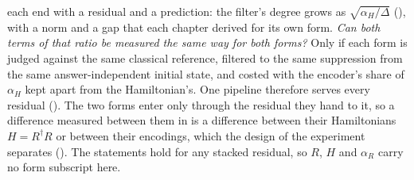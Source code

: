 
 each end with a residual and a prediction: the filter's degree grows as $\sqrt{\alpha_H/\Delta}$ (), with a norm and a gap that each chapter derived for its own form. \emph{Can both terms of that ratio be measured the same way for both forms?} Only if each form is judged against the same classical reference, filtered to the same suppression from the same answer-independent initial state, and costed with the encoder's share of $\alpha_H$ kept apart from the Hamiltonian's. One pipeline therefore serves every residual (). The two forms enter only through the residual they hand to it, so a difference measured between them in  is a difference between their Hamiltonians $H=R^\dagger R$ or between their encodings, which the design of the experiment separates (). The statements hold for any stacked residual, so $R$, $H$ and $\alpha_R$ carry no form subscript here.


